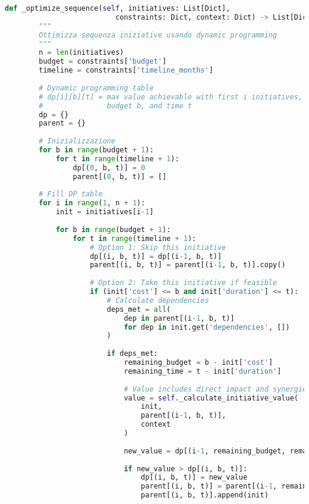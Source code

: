 \begin{lstlisting}[language=Python, caption=Generazione Roadmap Ottimizzata GIST]
    def _optimize_sequence(self, initiatives: List[Dict], 
                          constraints: Dict, context: Dict) -> List[Dict]:
        """
        Ottimizza sequenza iniziative usando dynamic programming
        """
        n = len(initiatives)
        budget = constraints['budget']
        timeline = constraints['timeline_months']
        
        # Dynamic programming table
        # dp[i][b][t] = max value achievable with first i initiatives,
        #               budget b, and time t
        dp = {}
        parent = {}
        
        # Inizializzazione
        for b in range(budget + 1):
            for t in range(timeline + 1):
                dp[(0, b, t)] = 0
                parent[(0, b, t)] = []
        
        # Fill DP table
        for i in range(1, n + 1):
            init = initiatives[i-1]
            
            for b in range(budget + 1):
                for t in range(timeline + 1):
                    # Option 1: Skip this initiative
                    dp[(i, b, t)] = dp[(i-1, b, t)]
                    parent[(i, b, t)] = parent[(i-1, b, t)].copy()
                    
                    # Option 2: Take this initiative if feasible
                    if (init['cost'] <= b and init['duration'] <= t):
                        # Calculate dependencies
                        deps_met = all(
                            dep in parent[(i-1, b, t)] 
                            for dep in init.get('dependencies', [])
                        )
                        
                        if deps_met:
                            remaining_budget = b - init['cost']
                            remaining_time = t - init['duration']
                            
                            # Value includes direct impact and synergies
                            value = self._calculate_initiative_value(
                                init, 
                                parent[(i-1, b, t)],
                                context
                            )
                            
                            new_value = dp[(i-1, remaining_budget, remaining_time)] + value
                            
                            if new_value > dp[(i, b, t)]:
                                dp[(i, b, t)] = new_value
                                parent[(i, b, t)] = parent[(i-1, remaining_budget, remaining_time)].copy()
                                parent[(i, b, t)].append(init)
        

\end{lstlisting}
